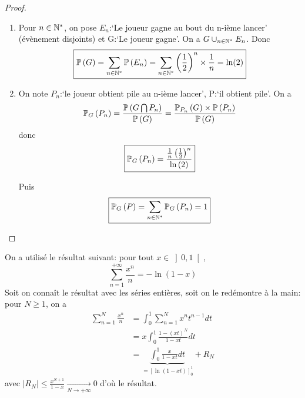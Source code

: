 \documentclass[12pt]{article}
\begin{document}
\begin{proof}
    \phantom{}
    \begin{enumerate}
        \item Pour $n\in\N^{*}$, on pose $E_{n}$:`Le joueur gagne au bout du n-ième lancer' (évènement disjoints) et G:`Le joueur gagne'. On a $G\cup_{n\in\N^{*}}E_{n}$. Donc 
        \begin{equation}
            \boxed{\P\left(G\right)=\sum_{n\in\N^{*}}\P\left(E_{n}\right)=\sum_{n\in\N^{*}}\left(\frac{1}{2}\right)^{n}\times\frac{1}{n}=\ln(2)}
        \end{equation}

        \item On note $P_{n}$:`le joueur obtient pile au n-ième lancer', P:`il obtient pile'. On a 
        \begin{equation}
            \P_{G}\left(P_{n}\right)=\frac{\P\left(G\bigcap P_{n}\right)}{\P\left(G\right)}=\frac{\P_{P_{n}}\left(G\right)\times\P\left(P_{n}\right)}{\P\left(G\right)}
        \end{equation}
        donc 
        \begin{equation}
            \boxed{\P_{G}\left(P_{n}\right)=\frac{\frac{1}{n}\left(\frac{1}{2}    \right)^{n}}{\ln\left(2\right)}}
        \end{equation}

        Puis 
        \begin{equation}
            \boxed{\P_{G}\left(P\right)=\sum_{n\in\N^{*}}\P_{G}\left(P_{n}\right)=1}
        \end{equation}
    \end{enumerate}
\end{proof}

\begin{remark}
    On a utilisé le résultat suivant: pour tout $x\in\left]0,1\right[$, 
    \begin{equation}
        \sum_{n=1}^{+\infty}\frac{x^{n}}{n}=-\ln\left(1-x\right)
    \end{equation}
    Soit on connaît le résultat avec les séries entières, soit on le redémontre à la main: pour $N\geqslant1$, on a 
    \begin{align}
        \sum_{n=1}^{N}\frac{x^{n}}{n}
        &=\int_{0}^{1}\sum_{n=1}^{N}x^{n}t^{n-1}dt\\
        &=x\int_{0}^{1}\frac{1-\left(xt\right)^{N}}{1-xt}dt\\
        &=\underbrace{\int_{0}^{1}\frac{x}{1-xt}dt}_{=\left[\ln\left(1-xt\right)\right]_{0}^{1}}+R_{N}
    \end{align}
    avec $\left\lvert R_{N}\right\rvert\leqslant\frac{x^{N+1}}{1-x}\xrightarrow[N\to+\infty]{}0$ d'où le résultat.
\end{remark}
\end{document}

